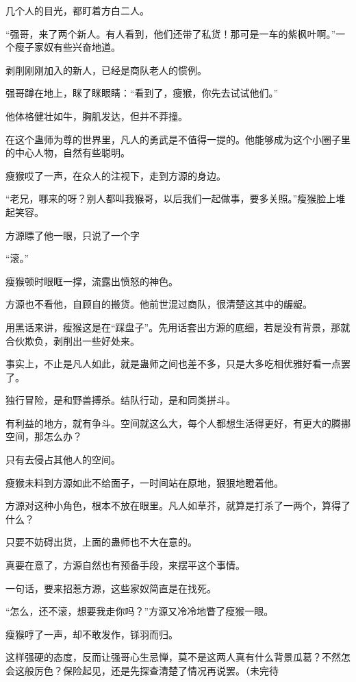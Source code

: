 \begin{this_body}
几个人的目光，都盯着方白二人。

“强哥，来了两个新人。有人看到，他们还带了私货！那可是一车的紫枫叶啊。”一个瘦子家奴有些兴奋地道。

剥削刚刚加入的新人，已经是商队老人的惯例。

强哥蹲在地上，眯了眯眼睛：“看到了，瘦猴，你先去试试他们。”

他体格健壮如牛，胸肌发达，但并不莽撞。

在这个蛊师为尊的世界里，凡人的勇武是不值得一提的。他能够成为这个小圈子里的中心人物，自然有些聪明。

瘦猴哎了一声，在众人的注视下，走到方源的身边。

“老兄，哪来的呀？别人都叫我猴哥，以后我们一起做事，要多关照。”瘦猴脸上堆起笑容。

方源瞟了他一眼，只说了一个字

“滚。”

瘦猴顿时眼眶一撑，流露出愤怒的神色。

方源也不看他，自顾自的搬货。他前世混过商队，很清楚这其中的龌龊。

用黑话来讲，瘦猴这是在“踩盘子”。先用话套出方源的底细，若是没有背景，那就合伙欺负，剥削出一些好处来。

事实上，不止是凡人如此，就是蛊师之间也差不多，只是大多吃相优雅好看一点罢了。

独行冒险，是和野兽搏杀。结队行动，是和同类拼斗。

有利益的地方，就有争斗。空间就这么大，每个人都想生活得更好，有更大的腾挪空间，那怎么办？

只有去侵占其他人的空间。

瘦猴未料到方源如此不给面子，一时间站在原地，狠狠地瞪着他。

方源对这种小角色，根本不放在眼里。凡人如草芥，就算是打杀了一两个，算得了什么？

只要不妨碍出货，上面的蛊师也不大在意的。

真要在意了，方源自然也有预备手段，来摆平这个事情。

一句话，要来招惹方源，这些家奴简直是在找死。

“怎么，还不滚，想要我走你吗？”方源又冷冷地瞥了瘦猴一眼。

瘦猴哼了一声，却不敢发作，铩羽而归。

这样强硬的态度，反而让强哥心生忌惮，莫不是这两人真有什么背景瓜葛？不然怎会这般厉色？保险起见，还是先探查清楚了情况再说罢。（未完待

\end{this_body}

